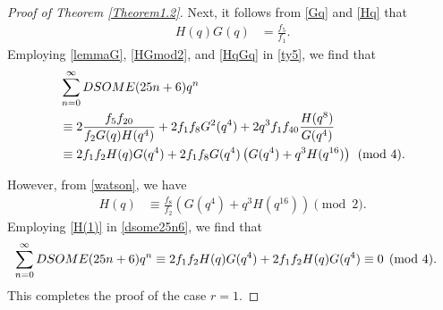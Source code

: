 \documentclass[12pt]{amsart}
\theoremstyle{definition}
\numberwithin{equation}{section}
\begin{document}
\begin{proof}[Proof of Theorem \ref{Theorem1.2}]
    Next, it follows from \eqref{Gq} and \eqref{Hq} that
     \begin{align} H(q)G(q)&=\frac{f_{5}}{f_1}.\label{HqGq}
\end{align}
Employing \eqref{lemmaG}, \eqref{HGmod2}, and \eqref{HqGq} in \eqref{ty5}, we find that
 \begin{align}   \label{dsome25n6}&\sum_{n=0}^{\infty}DSOME(25n+6)q^n\\
 &\equiv 2\frac{f_5f_{20}}{f_2G(q)H(q^4)}+2f_1f_8G^2(q^4)+2q^3f_1f_{40}\dfrac{H(q^8)}{G(q^4)}\notag\\ 
&\equiv 2f_1f_2H(q)G(q^4)+2f_1f_8G(q^4)\left(G(q^4)+q^3H(q^{16})\right)\pmod{4}.\notag
\end{align}

However, from \eqref{watson}, we have
       \begin{align} H(q)&\equiv \frac{f_8}{f_2}\left(G(q^4)+q^3H(q^{16})\right)\pmod{2}.\label{H(1)}
        \end{align}
Employing \eqref{H(1)} in \eqref{dsome25n6}, we find that
    \begin{align}
\sum_{n=0}^{\infty}DSOME(25n+6)q^n&\equiv 2f_1f_2H(q)G(q^4)+2f_1f_2H(q)G(q^4)\equiv0\pmod{4}.\notag 
        \end{align}
        This completes the proof of the case $r=1$.
        

\end{proof}
\end{document}
